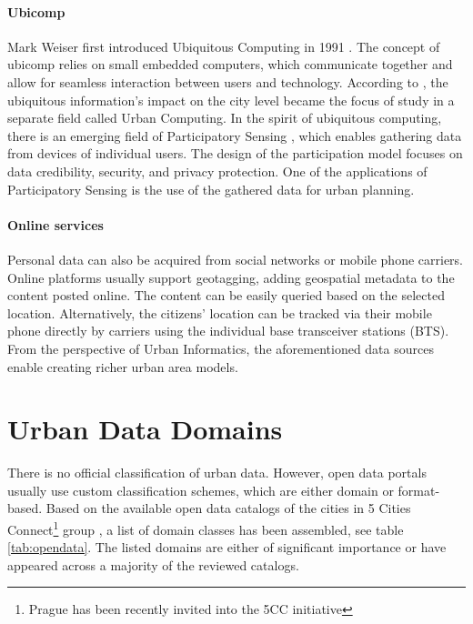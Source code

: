 \paragraph{Ubicomp} Mark Weiser first introduced Ubiquitous Computing in 1991 \cite{weiser1991computer}. The concept of ubicomp relies on small embedded computers, which communicate together and allow for seamless interaction between users and technology. According to \cite{zheng2011urban}, the ubiquitous information's impact on the city level became the focus of study in a separate field called Urban Computing. In the spirit of ubiquitous computing, there is an emerging field of Participatory Sensing \cite{burke2006participatory}, which enables gathering data from devices of individual users. The design of the participation model focuses on data credibility, security, and privacy protection. One of the applications of Participatory Sensing is the use of the gathered data for urban planning. 

\paragraph{Online services}
Personal data can also be acquired from social networks or mobile phone carriers. Online platforms usually support geotagging, adding geospatial metadata to the content posted online. The content can be easily queried based on the selected location. Alternatively, the citizens' location can be tracked via their mobile phone directly by carriers using the individual base transceiver stations (BTS).  From the perspective of Urban Informatics, the aforementioned data sources enable creating richer urban area models. 

\section{Urban Data Domains}
There is no official classification of urban data. However, open data portals usually use custom classification schemes, which are either domain or format-based. Based on the available open data catalogs of the cities in 5 Cities Connect\footnote{Prague has been recently invited into the 5CC initiative} group \cite{5CC}, a list of domain classes has been assembled, see table \ref{tab:opendata}. The listed domains are either of significant importance or have appeared across a majority of the reviewed catalogs.  


